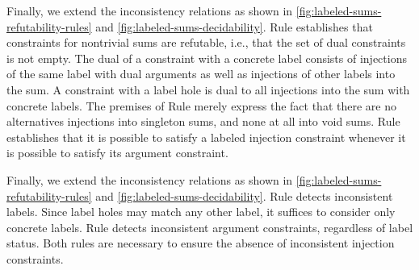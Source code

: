 
Finally, we extend the inconsistency relations as shown in \autoref{fig:labeled-sums-refutability-rules} and \autoref{fig:labeled-sums-decidability}.
Rule \RXInj establishes that constraints for nontrivial sums are refutable, i.e., that the set of dual constraints is not empty.
The dual of a constraint with a concrete label consists of injections of the same label with dual arguments as well as injections of other labels into the sum.
A constraint with a label hole is dual to all injections into the sum with concrete labels.
The premises of Rule \RInjMult merely express the fact that there are no alternatives injections into singleton sums, and none at all into void sums.
Rule \PInj establishes that it is possible to satisfy a labeled injection constraint whenever it is possible to satisfy its argument constraint.


Finally, we extend the inconsistency relations as shown in \autoref{fig:labeled-sums-refutability-rules} and \autoref{fig:labeled-sums-decidability}.
Rule \CINCInjTag detects inconsistent labels.
Since label holes may match any other label, it suffices to consider only concrete labels.
Rule \CINCInjArg detects inconsistent argument constraints, regardless of label status.
Both rules are necessary to ensure the absence of inconsistent injection constraints.


